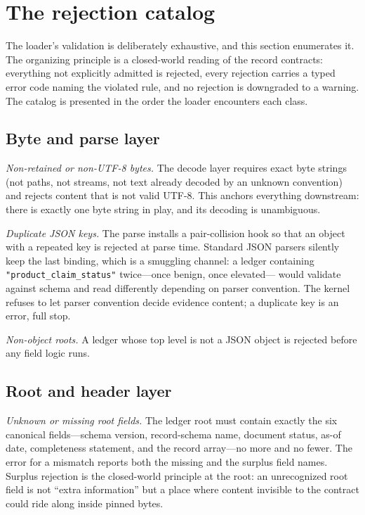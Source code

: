 \section{The rejection catalog}\label{ch06:rejection}

The loader's validation is deliberately exhaustive, and this section
enumerates it. The organizing principle is a closed-world reading of the
record contracts: everything not explicitly admitted is rejected, every
rejection carries a typed error code naming the violated rule, and no
rejection is downgraded to a warning. The catalog is presented in the
order the loader encounters each class.

\subsection{Byte and parse layer}

\emph{Non-retained or non-UTF-8 bytes.} The decode layer requires exact
byte strings (not paths, not streams, not text already decoded by an
unknown convention) and rejects content that is not valid UTF-8. This
anchors everything downstream: there is exactly one byte string in play,
and its decoding is unambiguous.

\emph{Duplicate JSON keys.} The parse installs a pair-collision hook so
that an object with a repeated key is rejected at parse time. Standard
JSON parsers silently keep the last binding, which is a smuggling
channel: a ledger containing
\texttt{"product\_claim\_status"} twice---once benign, once elevated---
would validate against schema and read differently depending on parser
convention. The kernel refuses to let parser convention decide evidence
content; a duplicate key is an error, full stop.

\emph{Non-object roots.} A ledger whose top level is not a JSON object is
rejected before any field logic runs.

\subsection{Root and header layer}

\emph{Unknown or missing root fields.} The ledger root must contain
exactly the six canonical fields---schema version, record-schema name,
document status, as-of date, completeness statement, and the record
array---no more and no fewer. The error for a mismatch reports both the
missing and the surplus field names. Surplus rejection is the closed-world
principle at the root: an unrecognized root field is not ``extra
information'' but a place where content invisible to the contract could
ride along inside pinned bytes.

